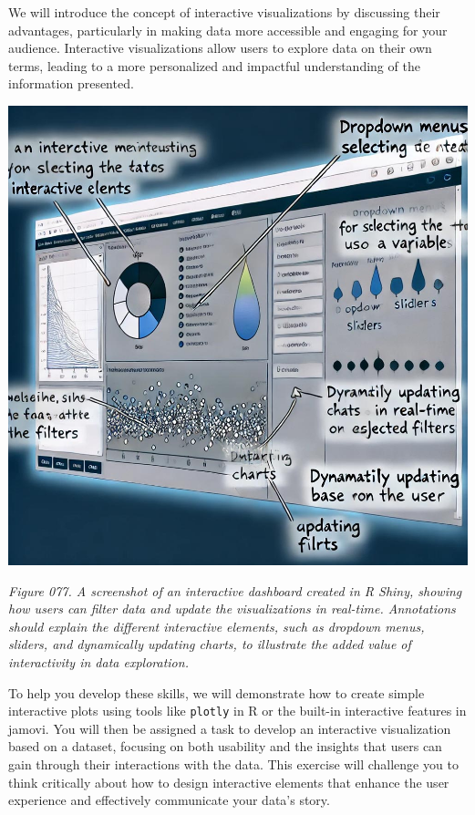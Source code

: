 \documentclass[
]{book}
\begin{document}
We will introduce the concept of interactive visualizations by discussing their advantages, particularly in making data more accessible and engaging for your audience. Interactive visualizations allow users to explore data on their own terms, leading to a more personalized and impactful understanding of the information presented.

\includegraphics[width=1\linewidth,height=\textheight,keepaspectratio]{images/fig077.jpg}

\emph{Figure 077. A screenshot of an interactive dashboard created in R Shiny, showing how users can filter data and update the visualizations in real-time. Annotations should explain the different interactive elements, such as dropdown menus, sliders, and dynamically updating charts, to illustrate the added value of interactivity in data exploration.}

To help you develop these skills, we will demonstrate how to create simple interactive plots using tools like \texttt{plotly} in R or the built-in interactive features in jamovi. You will then be assigned a task to develop an interactive visualization based on a dataset, focusing on both usability and the insights that users can gain through their interactions with the data. This exercise will challenge you to think critically about how to design interactive elements that enhance the user experience and effectively communicate your data's story.
\end{document}
